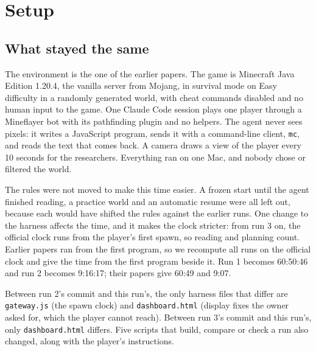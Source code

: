 \documentclass[11pt,a4paper]{article}
\begin{document}
\section{Setup}
\label{sec:setup}

\subsection{What stayed the same}

The environment is the one of the earlier papers. The game is Minecraft Java Edition 1.20.4, the vanilla server from Mojang, in survival mode on Easy difficulty in a randomly generated world, with cheat commands disabled and no human input to the game. One Claude Code session \citep{claudecode} plays one player through a Mineflayer bot \citep{mineflayer} with its pathfinding plugin and no helpers. The agent never sees pixels: it writes a JavaScript program, sends it with a command-line client, \texttt{mc}, and reads the text that comes back. A camera draws a view of the player every 10 seconds for the researchers. Everything ran on one Mac, and nobody chose or filtered the world.

The rules were not moved to make this time easier. A frozen start until the agent finished reading, a practice world and an automatic resume were all left out, because each would have shifted the rules against the earlier runs. One change to the harness affects the time, and it makes the clock stricter: from run 3 on, the official clock runs from the player's first spawn, so reading and planning count. Earlier papers ran from the first program, so we recompute all runs on the official clock and give the time from the first program beside it. Run 1 becomes 60:50:46 and run 2 becomes 9:16:17; their papers give 60:49 and 9:07.

Between run 2's commit and this run's, the only harness files that differ are \texttt{gateway.js} (the spawn clock) and \texttt{dashboard.html} (display fixes the owner asked for, which the player cannot reach). Between run 3's commit and this run's, only \texttt{dashboard.html} differs. Five scripts that build, compare or check a run also changed, along with the player's instructions.
\end{document}
